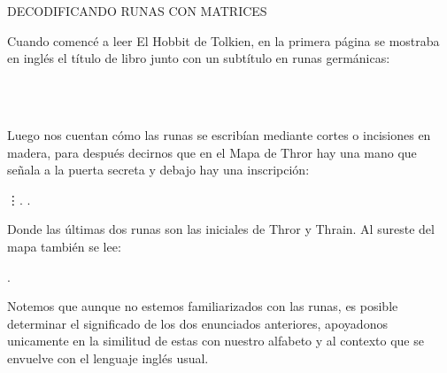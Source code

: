 \documentclass[12pt,a4paper]{article}
\begin{document}
\begin{center}
{\LARGE{DECODIFICANDO RUNAS CON MATRICES}}
\vspace{1cm}
\end{center}
Cuando comencé a leer El Hobbit de Tolkien, en la primera p\'agina se mostraba en ingl\'es el t\'itulo de libro junto con un subt\'itulo en runas germ\'anicas:
\begin{center}
\vspace{0.5cm}
{\LARGE{  }}\\
{\large{}}\\
{\large{   }}
\end{center}
\vspace{0.5cm}

Luego nos cuentan c\'omo las runas se escrib\'ian mediante cortes o incisiones en madera, para despu\'es decirnos que en el Mapa de Thror hay una mano que señala a la puerta secreta y debajo hay una inscripci\'on:
\vspace{0.2cm}
\begin{center}
               \vdots  \textara{\th}. \textara{\th}.
\end{center}
\vspace{0.2cm}

Donde las \'ultimas dos runas son las iniciales de Thror y Thrain. Al sureste del mapa tambi\'en se lee:
\vspace{0.4cm}

                                              .
\vspace{0.4cm}

Notemos que aunque no estemos familiarizados con las runas, es posible determinar el significado de los dos enunciados anteriores, apoyadonos unicamente en la similitud de estas con nuestro alfabeto y al contexto que se envuelve con el lenguaje ingl\'es usual.
\end{document}
